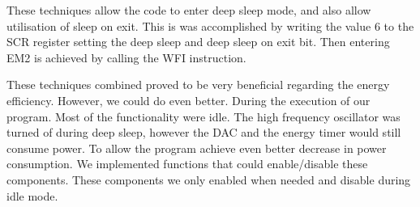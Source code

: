 These techniques allow the code to enter deep sleep mode, and also allow utilisation of sleep on exit. This is was accomplished by writing the value 6 to the SCR register setting the deep sleep and deep sleep on exit bit. Then entering EM2 is achieved by calling the WFI instruction.

These techniques combined proved to be very beneficial regarding the energy efficiency. However, we could do even better. During the execution of our program. Most of the functionality were idle. The high frequency oscillator was turned of during deep sleep, however the DAC and the energy timer would still consume power. To allow the program achieve even better decrease in power consumption. We implemented functions that could enable/disable these components. These components we only enabled when needed and disable during idle mode. 



 

  





   



  
       

 



